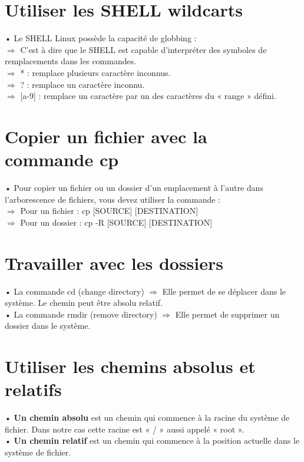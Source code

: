 \documentclass[a4paper, 12pt, french]{book}
\begin{document}
\section{\Large Utiliser les SHELL wildcarts} 
 
• Le SHELL Linux possède la capacité de globbing :\\
$\Rightarrow$ C’est à dire que le SHELL est capable d’interpréter des symboles de
remplacements dans les commandes.\\
$\Rightarrow$ * : remplace plusieurs caractère inconnus.\\
$\Rightarrow$ ? : remplace un caractère inconnu.\\
$\Rightarrow$ [a-9] : remplace un caractère par un des caractères du
« range » défini.
 
 
\section{\Large Copier un fichier avec la commande cp}  
 
• Pour copier un fichier ou un dossier d’un emplacement à l’autre dans l’arborescence de
fichiers, vous devez utiliser la commande :\\
$\Rightarrow$ Pour un fichier : cp [SOURCE] [DESTINATION]\\
$\Rightarrow$ Pour un dossier : cp -R [SOURCE] [DESTINATION]
 
\section{\Large Travailler avec les dossiers}

• La commande cd (change directory) $\Rightarrow$ Elle permet de se déplacer dans le système. Le chemin peut être absolu relatif.\\

• La commande rmdir (remove directory) $\Rightarrow$ Elle permet de supprimer un dossier dans le système.


\section{\Large Utiliser les chemins absolus et relatifs} 

• \textbf{Un chemin absolu} est un chemin qui commence à la racine du système de fichier.
 Dans notre cas cette racine est « / » aussi appelé « root ».\\

• \textbf{Un chemin relatif} est un chemin qui commence à la position actuelle dans le système de fichier.
\end{document}
